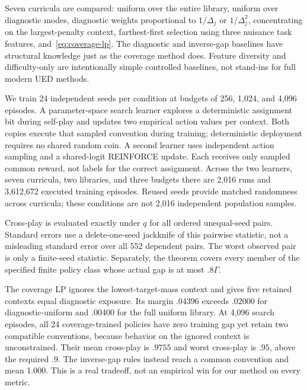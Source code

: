 \documentclass[11pt]{article}
\theoremstyle{definition}\newtheorem{definition}[theorem]{Definition}
\newcommand{\1}{\mathbf{1}}
\newcommand{\Gam}{\Gamma}
\begin{document}
Seven curricula are compared: uniform over the entire library, uniform over diagnostic modes, diagnostic weights proportional to $1/\Delta_j$ or $1/\Delta_j^2$, concentrating on the largest-penalty context, farthest-first selection using three nuisance task features, and~\eqref{eq:coverage-lp}. The diagnostic and inverse-gap baselines have structural knowledge just as the coverage method does. Feature diversity and difficulty-only are intentionally simple controlled baselines, not stand-ins for full modern UED methods.

We train 24 independent seeds per condition at budgets of 256, 1,024, and 4,096 episodes. A parameter-space search learner explores a deterministic assignment bit during self-play and updates two empirical action values per context. Both copies execute that sampled convention during training; deterministic deployment requires no shared random coin. A second learner uses independent action sampling and a shared-logit REINFORCE update. Each receives only sampled common reward, not labels for the correct assignment. Across the two learners, seven curricula, two libraries, and three budgets there are 2,016 runs and 3,612,672 executed training episodes. Reused seeds provide matched randomness across curricula; these conditions are not 2,016 independent population samples.

Cross-play is evaluated exactly under $q$ for all ordered unequal-seed pairs. Standard errors use a delete-one-seed jackknife of this pairwise statistic, not a misleading standard error over all 552 dependent pairs. The worst observed pair is only a finite-seed statistic. Separately, the theorem covers every member of the specified finite policy class whose actual gap is at most $.8\Gam$.

\begin{table}[t]
\centering\small
\caption{Parameter-space search after 4,096 episodes with 24 neutral modes. Mean $\pm$ seed-jackknife standard error. ``Eligible'' counts seeds with true gap at most $.8\Gam$ when $\Gam>0$; zero-margin curricula certify none. The coverage LP optimizes guaranteed tolerance, not mean cross-play, and is not uniformly best empirically.}
\label{tab:learning}
\end{table}

The coverage LP ignores the lowest-target-mass context and gives five retained contexts equal diagnostic exposure. Its margin $.04396$ exceeds $.02000$ for diagnostic-uniform and $.00400$ for the full uniform library. At 4,096 search episodes, all 24 coverage-trained policies have zero training gap yet retain two compatible conventions, because behavior on the ignored context is unconstrained. Their mean cross-play is $.9755$ and worst cross-play is $.95$, above the required $.9$. The inverse-gap rules instead reach a common convention and mean 1.000. This is a real tradeoff, not an empirical win for our method on every metric.
\end{document}
